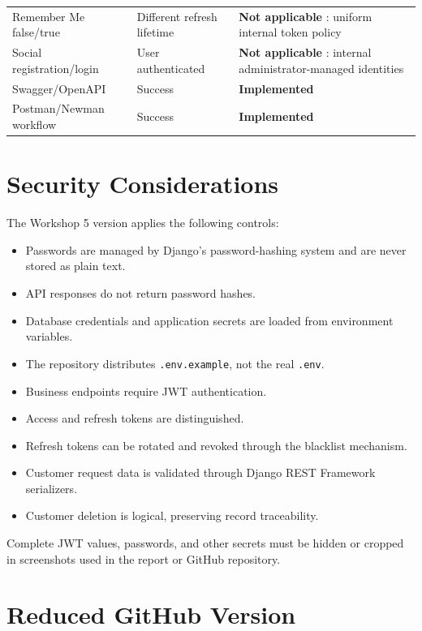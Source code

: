 \documentclass[11pt,a4paper]{article}
\newcommand{\implemented}{
    \textcolor{okgreen}{\textbf{Implemented}}
}
\newcommand{\notapplicable}{
    \textcolor{nogray}{\textbf{Not applicable}}
}
\begin{document}
\begin{longtable}{p{} p{} p{}}
Remember Me false/true & Different refresh lifetime & \notapplicable: uniform internal token policy \\

Social registration/login & User authenticated & \notapplicable: internal administrator-managed identities \\

Swagger/OpenAPI & Success & \implemented \\

Postman/Newman workflow & Success & \implemented \\

\bottomrule
\end{longtable}

\section{Security Considerations}

The Workshop 5 version applies the following controls:

\begin{itemize}[leftmargin=*]
    \item Passwords are managed by Django's password-hashing system and are never stored as plain text.
    \item API responses do not return password hashes.
    \item Database credentials and application secrets are loaded from environment variables.
    \item The repository distributes \texttt{.env.example}, not the real \texttt{.env}.
    \item Business endpoints require JWT authentication.
    \item Access and refresh tokens are distinguished.
    \item Refresh tokens can be rotated and revoked through the blacklist mechanism.
    \item Customer request data is validated through Django REST Framework serializers.
    \item Customer deletion is logical, preserving record traceability.
\end{itemize}

Complete JWT values, passwords, and other secrets must be hidden or cropped in screenshots used in the report or GitHub repository.

\section{Reduced GitHub Version}
\end{document}
